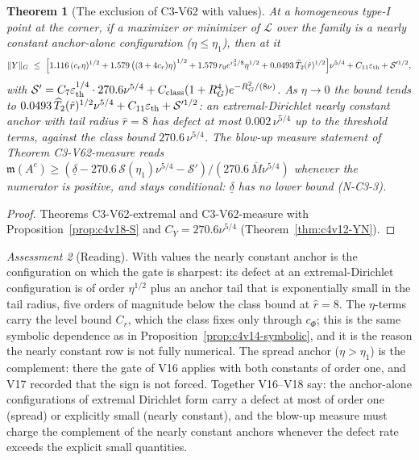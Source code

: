 \documentclass[11pt]{article}
\theoremstyle{plain}
\newtheorem{theorem}{Theorem}[section]
\theoremstyle{definition}
\theoremstyle{remark}
\newtheorem{assessment}[theorem]{Assessment}
\begin{document}
\begin{theorem}[The exclusion of C3-V62 with values]
\label{thm:c4v18-nearly-constant}
At a homogeneous type-I point at the corner, if a maximizer or
minimizer of \(\mathcal L\) over the family is a nearly constant anchor-alone
configuration (\(\eta\le\eta_1\)), then at it
\begin{equation}
 \|Y\|_G\ \le\ \Bigl[1.116\,(c_r\eta)^{1/2}+1.579\,\bigl((3+4c_r)\eta\bigr)^{1/2}+1.579\,r_0e^{r_2^2/8}\eta^{1/2}+0.0493\,\widehat T_2(\hat r)^{1/2}\Bigr]\nu^{5/4}+C_{11}\varepsilon_{\rm th}+\mathcal S'^{1/2},
 \label{eq:c4v18-nearly-constant}
\end{equation}
with \(\mathcal S'=C_7\varepsilon_{\rm th}^{1/4}\cdot270.6\nu^{5/4}+C_{\rm class}(1+R_G^4)e^{-R_G^2/(8\nu)}\).  As \(\eta\to0\) the bound
tends to \(0.0493\,\widehat T_2(\hat r)^{1/2}\nu^{5/4}+C_{11}\varepsilon_{\rm th}+\mathcal S'^{1/2}\): an extremal-Dirichlet
nearly constant anchor with tail radius \(\hat r=8\) has defect at most
\(0.002\,\nu^{5/4}\) up to the threshold terms, against the class bound
\(270.6\,\nu^{5/4}\).  The blow-up measure statement of Theorem C3-V62-measure
reads \(\mathfrak m(A^c)\ge(\underline\delta-270.6\,\mathcal S(\eta_1)\nu^{5/4}-\mathcal S')/(270.6\,\overline M\nu^{5/4})\) whenever the
numerator is positive, and stays conditional: \(\underline\delta\) has no lower
bound (N-C3-3).
\end{theorem}

\begin{proof}
Theorems C3-V62-extremal and C3-V62-measure with
Proposition~\ref{prop:c4v18-S} and \(C_Y=270.6\nu^{5/4}\) (Theorem~\ref{thm:c4v12-YN}).
\end{proof}

\begin{assessment}[Reading]
\label{ass:c4v18-reading}
With values the nearly constant anchor is the configuration on which
the gate is sharpest: its defect at an extremal-Dirichlet
configuration is of order \(\eta^{1/2}\) plus an anchor tail that is
exponentially small in the tail radius, five orders of magnitude
below the class bound at \(\hat r=8\).  The \(\eta\)-terms carry the level bound
\(C_r\), which the class fixes only through \(c_\Phi\); this is the same
symbolic dependence as in Proposition~\ref{prop:c4v14-symbolic}, and it
is the reason the nearly constant row is not fully numerical.  The
spread anchor (\(\eta>\eta_1\)) is the complement: there the gate of V16
applies with both constants of order one, and V17 recorded that the
sign is not forced.  Together V16--V18 say: the anchor-alone
configurations of extremal Dirichlet form carry a defect at most of
order one (spread) or explicitly small (nearly constant), and the
blow-up measure must charge the complement of the nearly constant
anchors whenever the defect rate exceeds the explicit small
quantities.
\end{assessment}
\end{document}
